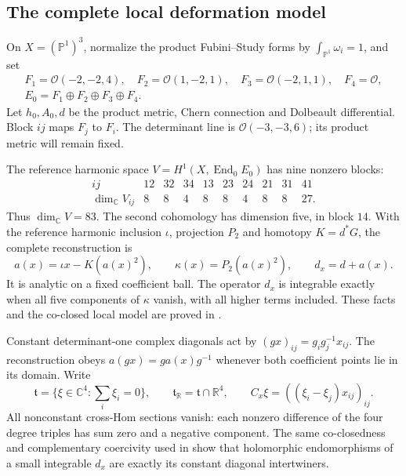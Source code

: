 \documentclass[11pt]{amsart}
\theoremstyle{definition}
\theoremstyle{remark}
\newcommand{\CC}{\mathbb C}
\newcommand{\RR}{\mathbb R}
\newcommand{\PP}{\mathbb P}
\newcommand{\cO}{\mathcal O}
\newcommand{\End}{\operatorname{End}}
\begin{document}
\subsection{The complete local deformation model}
On $X=(\PP^1)^3$, normalize the product Fubini--Study forms by
$\int_{\PP^1}\omega_i=1$, and set
\begin{equation}\label{eq:factors}
 \begin{gathered}
 F_1=\cO(-2,-2,4),\quad F_2=\cO(1,-2,1),\quad
 F_3=\cO(-2,1,1),\quad F_4=\cO,\\
 E_0=F_1\oplus F_2\oplus F_3\oplus F_4 .
 \end{gathered}
\end{equation}
Let $h_0,A_0,d$ be the product metric, Chern connection and
Dolbeault differential. Block $ij$ maps $F_j$ to $F_i$.
The determinant line is $\cO(-3,-3,6)$; its product metric
will remain fixed.

The reference harmonic space $V=H^1(X,\End_0E_0)$ has nine
nonzero blocks:
\[
 \begin{array}{c|ccc|ccc|ccc}
 ij&12&32&34&13&23&24&21&31&41\\ \hline
 \dim_{\CC}V_{ij}&8&8&4&8&8&4&8&8&27 .
 \end{array}
\]
Thus $\dim_{\CC}V=83$. The second cohomology has dimension
five, in block $14$. With the reference harmonic inclusion
$\iota$, projection $P_2$ and homotopy $K=d^*G$, the complete
reconstruction is
\begin{equation}\label{eq:reconstruction}
 a(x)=\iota x-K(a(x)^2),\qquad
 \kappa(x)=P_2(a(x)^2),\qquad d_x=d+a(x).
\end{equation}
It is analytic on a fixed coefficient ball. The operator $d_x$
is integrable exactly when all five components of $\kappa$
vanish, with all higher terms included. These facts and the
co-closed local model are proved in
\cite[Sections 6 and 9]{WuebbenWall26}.

Constant determinant-one complex diagonals act by
$(gx)_{ij}=g_i g_j^{-1}x_{ij}$. The reconstruction obeys
$a(gx)=ga(x)g^{-1}$ whenever both coefficient points lie in
its domain. Write
\[
 \mathfrak t=\{\xi\in\CC^4:\textstyle\sum_i\xi_i=0\},\qquad
 \mathfrak t_{\RR}=\mathfrak t\cap\RR^4,\qquad
 C_x\xi=((\xi_i-\xi_j)x_{ij})_{ij}.
\]
All nonconstant cross-Hom sections vanish: each nonzero
difference of the four degree triples has sum zero and a
negative component. The same co-closedness and complementary
coercivity used in \cite{WuebbenWall26} show that holomorphic
endomorphisms of a small integrable $d_x$ are exactly its
constant diagonal intertwiners.
\end{document}
